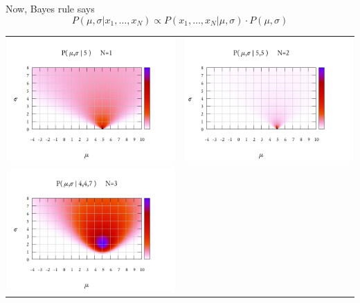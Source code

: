 Now, Bayes rule says
$$
P(\mu,\sigma|x_1,\ldots,x_N)\propto
P(x_1,\ldots,x_N|\mu,\sigma)\cdot P(\mu,\sigma)
$$

\begin{tabular}{ll}
	\includegraphics{bayes1.png}&
	\includegraphics{bayes2.png}\\
	\includegraphics{bayes3.png}&

\end{tabular}
